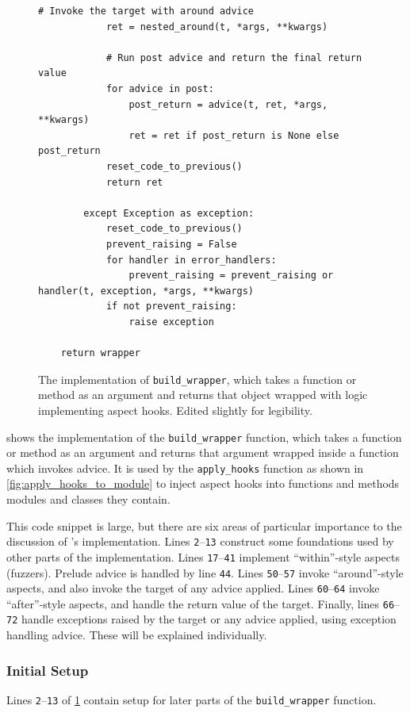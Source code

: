 \begin{figure}
\begin{lstlisting}[style=footnotesize_python]
            # Invoke the target with around advice
            ret = nested_around(t, *args, **kwargs)
            
            # Run post advice and return the final return value
            for advice in post:
                post_return = advice(t, ret, *args, **kwargs)
                ret = ret if post_return is None else post_return
            reset_code_to_previous()
            return ret

        except Exception as exception:
            reset_code_to_previous()
            prevent_raising = False
            for handler in error_handlers:
                prevent_raising = prevent_raising or handler(t, exception, *args, **kwargs)
            if not prevent_raising:
                raise exception

    return wrapper
    \end{lstlisting}
    \caption{The implementation of \lstinline{build_wrapper}, which takes a
    function or method as an argument and returns that object wrapped with logic
    implementing aspect hooks. Edited slightly for legibility.}
    \label{fig:build_wrapper_impl}
\end{figure}

 shows the implementation of the
\lstinline{build_wrapper} function, which takes a function or method as an
argument and returns that argument wrapped inside a function which invokes
advice. It is used by the \lstinline{apply_hooks} function as shown in
\cref{fig:apply_hooks_to_module} to inject aspect hooks into functions and
methods modules and classes they contain.

This code snippet is large, but there are six areas of particular importance to
the discussion of \pdsfthree{}'s implementation. Lines \texttt{2}--\texttt{13}
construct some foundations used by other parts of the implementation. Lines
\texttt{17}--\texttt{41} implement ``within''-style aspects (fuzzers). Prelude
advice is handled by line \texttt{44}. Lines
\texttt{50}--\texttt{57} invoke ``around''-style aspects, and also invoke the target
of any advice applied. Lines
\texttt{60}--\texttt{64} invoke ``after''-style aspects, and handle the return
value of the target. Finally, lines \texttt{66}--\texttt{72} handle exceptions
raised by the target or any advice applied, using exception handling advice.
These will be explained individually.

\subsubsection{Initial Setup}
Lines \texttt{2}--\texttt{13} of \cref{fig:build_wrapper_impl} contain setup for
later parts of the \lstinline{build_wrapper} function.

